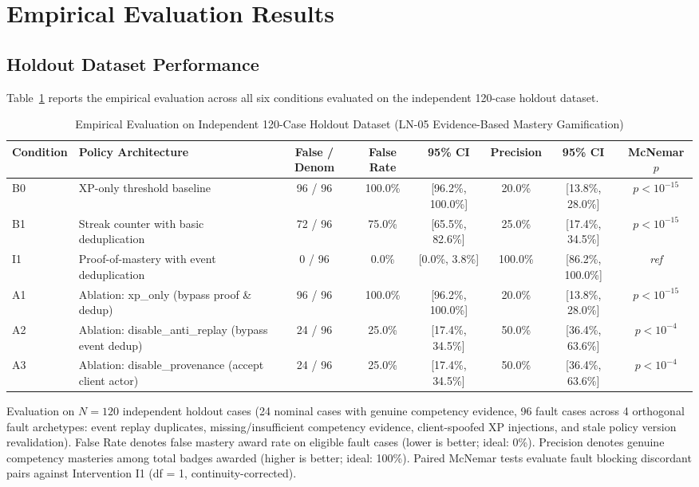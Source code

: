 \documentclass[11pt,a4paper]{article}
\begin{document}
\section{Empirical Evaluation Results}

\subsection{Holdout Dataset Performance}
Table~\ref{tab:ln-05-holdout-benchmark} reports the empirical evaluation across all six conditions evaluated on the independent 120-case holdout dataset.

\begin{table}[htbp]
\centering
\small
\caption{Empirical Evaluation on Independent 120-Case Holdout Dataset (LN-05 Evidence-Based Mastery Gamification)}
\label{tab:ln-05-holdout-benchmark}
\begin{tabular}{llcccccc}
\toprule
Condition & Policy Architecture & False / Denom & False Rate & 95\% CI & Precision & 95\% CI & McNemar $p$ \\
\midrule
B0 & XP-only threshold baseline & 96 / 96 & 100.0\% & [96.2\%, 100.0\%] & 20.0\% & [13.8\%, 28.0\%] & $p < 10^{-15}$ \\
B1 & Streak counter with basic deduplication & 72 / 96 & 75.0\% & [65.5\%, 82.6\%] & 25.0\% & [17.4\%, 34.5\%] & $p < 10^{-15}$ \\
I1 & Proof-of-mastery with event deduplication & 0 / 96 & 0.0\% & [0.0\%, 3.8\%] & 100.0\% & [86.2\%, 100.0\%] & \textit{ref} \\
A1 & Ablation: xp\_only (bypass proof \& dedup) & 96 / 96 & 100.0\% & [96.2\%, 100.0\%] & 20.0\% & [13.8\%, 28.0\%] & $p < 10^{-15}$ \\
A2 & Ablation: disable\_anti\_replay (bypass event dedup) & 24 / 96 & 25.0\% & [17.4\%, 34.5\%] & 50.0\% & [36.4\%, 63.6\%] & $p < 10^{-4}$ \\
A3 & Ablation: disable\_provenance (accept client actor) & 24 / 96 & 25.0\% & [17.4\%, 34.5\%] & 50.0\% & [36.4\%, 63.6\%] & $p < 10^{-4}$ \\
\bottomrule
\end{tabular}
\par\smallskip
\begin{minipage}{0.98\linewidth}\footnotesize
Evaluation on $N=120$ independent holdout cases (24 nominal cases with genuine competency evidence, 96 fault cases across 4 orthogonal fault archetypes: event replay duplicates, missing/insufficient competency evidence, client-spoofed XP injections, and stale policy version revalidation). False Rate denotes false mastery award rate on eligible fault cases (lower is better; ideal: 0\%). Precision denotes genuine competency masteries among total badges awarded (higher is better; ideal: 100\%). Paired McNemar tests evaluate fault blocking discordant pairs against Intervention I1 (df = 1, continuity-corrected).
\end{minipage}
\end{table}
\end{document}

